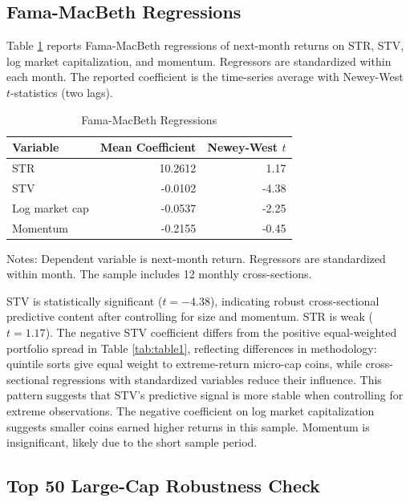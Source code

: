 \documentclass[11pt]{article}
\begin{document}
\subsection{Fama-MacBeth Regressions}

Table \ref{tab:table2} reports Fama-MacBeth regressions of next-month returns on STR, STV, log market capitalization, and momentum. Regressors are standardized within each month. The reported coefficient is the time-series average with Newey-West $t$-statistics (two lags).

\begin{table}[H]
\centering
\small
\singlespacing
\caption{Fama-MacBeth Regressions}
\label{tab:table2}
\begin{tabular}{lrr}
\toprule
Variable & Mean Coefficient & Newey-West $t$ \\
\midrule
STR & 10.2612 & 1.17 \\
STV & -0.0102 & -4.38 \\
Log market cap & -0.0537 & -2.25 \\
Momentum & -0.2155 & -0.45 \\
\bottomrule
\end{tabular}
\begin{flushleft}
\footnotesize Notes: Dependent variable is next-month return. Regressors are standardized within month. The sample includes 12 monthly cross-sections.
\end{flushleft}
\end{table}

STV is statistically significant ($t = -4.38$), indicating robust cross-sectional predictive content after controlling for size and momentum. STR is weak ($t = 1.17$). The negative STV coefficient differs from the positive equal-weighted portfolio spread in Table \ref{tab:table1}, reflecting differences in methodology: quintile sorts give equal weight to extreme-return micro-cap coins, while cross-sectional regressions with standardized variables reduce their influence. This pattern suggests that STV's predictive signal is more stable when controlling for extreme observations. The negative coefficient on log market capitalization suggests smaller coins earned higher returns in this sample. Momentum is insignificant, likely due to the short sample period.

\subsection{Top 50 Large-Cap Robustness Check}
\end{document}
